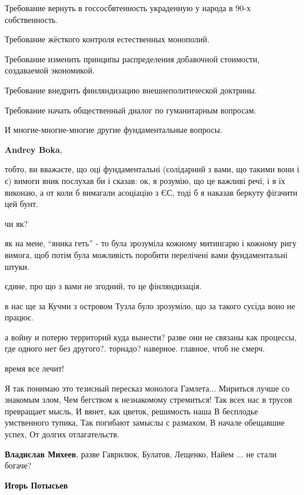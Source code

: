 \begin{itemize}
\begin{itemize}
Требование вернуть в госсосбвтенность украденную у народа в 90-х собственность.

Требование жёсткого контроля естественных монополий.

Требование изменить принципы распределения добавочной стоимости, создаваемой
экономикой.

Требование внедрить финляндизацию внешнеполитической доктрины.

Требование начать общественный диалог по гуманитарным вопросам.

И многие-многие-многие другие фундаментальные вопросы.

\textbf{Andrey Boka}, 

тобто, ви вважаєте, що оці фундаментальні (солідарний з вами, що такими вони і
є) вимоги яник послухав би і сказав: ок, я розумію, що це важливі речі, і я їх
виконаю, а от коли б вимагали асоціацію з ЄС, тоді б я наказав беркуту фігачити
цей бунт.

чи як?

як на мене, \enquote{яника геть} - то була зрозуміла кожному митингарю і кожному ригу
вимога, щоб потім була можливість поробити перелічені вами фундаментальні
штуки.

єдине, про що з вами не згодний, то це фінляндизація.

в нас ще за Кучми з островом Тузла було зрозуміло, що за такого сусіда воно не
працює.

\end{itemize} %


а войну и потерю территорий куда вынести? разве они не связаны как процессы,
где одного нет без другого?. торнадо? наверное. главное, чтоб не смерч.

время все лечит!


\obeycr
Я так понимаю это тезисный пересказ монолога Гамлета... 
Мириться лучше со знакомым злом,
Чем бегством к незнакомому стремиться!
Так всех нас в трусов превращает мысль,
И вянет, как цветок, решимость наша
В бесплодье умственного тупика,
Так погибают замыслы с размахом,
В начале обещавшие успех,
От долгих отлагательств.
\restorecr

\textbf{Владислав Михеев}, разве Гаврилюк, Булатов, Лещенко, Найем ... не стали богаче?

\begin{itemize} %
\textbf{Игорь Потысьев} 


\end{itemize}
\end{itemize}
